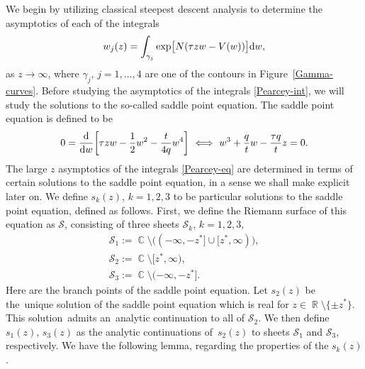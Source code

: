 \documentclass[pdftex]{sigma}
\DeclareMathOperator{\CC}{\mathbb{C}}
\DeclareMathOperator{\RR}{\mathbb{R}}
\numberwithin{equation}{section}
\begin{document}
We begin by utilizing classical steepest descent analysis to determine the asymptotics of each of the integrals
 \begin{equation}\label{Pearcey-int}
 w_j(z) = \int_{\gamma_j} \exp\bigl[ N(\tau z w - V(w) )\bigr] {\rm d}w,
 \end{equation}
as $z \to \infty$, where $\gamma_j$, $j = 1,\dots,4$ are one of the contours in Figure~\ref{Gamma-curves}. Before studying the asymptotics of the integrals \eqref{Pearcey-int}, we will study the solutions to the so-called saddle point equation. The saddle point equation is defined to be
 \begin{equation*}
 0 = \frac{\rm d}{{\rm d}w}\biggl[\tau z w -\frac{1}{2}w^2 -\frac{t}{4q}w^4\biggr] \ \Longleftrightarrow\ w^3 + \frac{q}{t}w -\frac{\tau q}{t}z = 0.
 \end{equation*}
The large $z$ asymptotics of the integrals \eqref{Pearcey-eq} are determined in terms of certain solutions to the saddle point equation, in a sense we shall make explicit later on.
We define $s_k(z)$, $k=1,2,3$ to be particular solutions to the saddle point equation, defined as follows. First, we define the Riemann surface of this equation
as $\mathcal{S}$, consisting of three sheets $\mathcal{S}_k$, $k=1,2,3$,
\begin{gather*}
 \mathcal{S}_{1} := \CC \setminus \bigl((-\infty,-z^*] \cup [z^*,\infty)\bigr),\\%
 \mathcal{S}_{2} := \CC \setminus [z^*,\infty),\\%
 \mathcal{S}_{3} := \CC \setminus (-\infty,-z^*].%
\end{gather*}
Here  are the branch points of the saddle point equation.
Let $s_2(z)$ be the~unique solution of the saddle point equation which is real for $z\in \RR \setminus\{\pm z^*\}$. This solution~admits an~analytic continuation to all of $\mathcal{S}_2$. We then define $s_1(z)$, $s_3(z)$ as the analytic continuations of~$s_2(z)$ to sheets $\mathcal{S}_1$ and $\mathcal{S}_3$, respectively.
We have the following lemma, regarding the properties of the $s_k(z)$.
\end{document}
